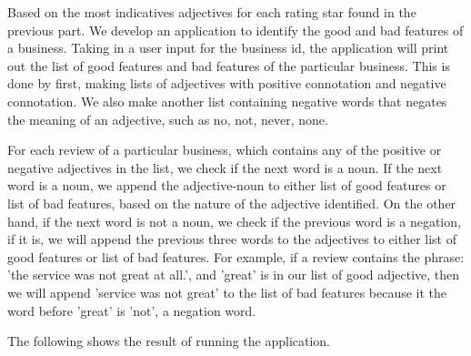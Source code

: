 Based on the most indicatives adjectives for each rating star found in the previous part. We develop an application to identify the good and bad features of a business. Taking in a user input for the business id, the application will print out the list of good features and bad features of the particular business. This is done by first, making lists of adjectives with positive connotation and negative connotation. We also make another list containing negative words that negates the meaning of an adjective, such as no, not, never, none. 

For each review of a particular business, which contains any of the positive or negative adjectives in the list, we check if the next word is a noun. If the next word is a noun, we append the adjective-noun to either list of good features or list of bad features, based on the nature of the adjective identified. On the other hand, if the next word is not a noun, we check if the previous word is a negation, if it is, we will append the previous three words to the adjectives to either list of good features or list of bad features. For example, if a review contains the phrase: 'the service was not great at all.', and 'great' is in our list of good adjective, then we will append 'service was not great' to the list of bad features because it the word before 'great' is 'not', a negation word.

The following shows the result of running the application.

